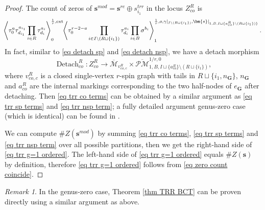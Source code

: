\documentclass[11pt]{amsart}
\theoremstyle{definition}
\theoremstyle{remark}
\newtheorem{rmk}[dummy]{Remark}
\newcommand{\oPMb}{{\overline{\mathcal{PM}}}}
\newcommand{\<}{\left<}
\renewcommand{\>}{\right>}
\numberwithin{equation}{section}
\def\Mbar{{\overline{\mathcal M}}}
\begin{document}
\begin{proof}
         The count of zeros of $\bm{s}^{mod}=\bm{s}^{re}\oplus s^{trr}_{i_1}$ in the locus $Z_{co}^{R}$ %
is 
             \begin{equation}\label{eq trr co terms}
                \hspace{-0.1cm}\left\langle \tau_0^{a}\tau_{d_{i_1}}^{a_{i_1}}\prod_{i \in R}\tau_{d_i}^{a_i}\right\rangle^{\frac{1}{r},\text{ext}}_0
                \hspace{-0.1cm}\left\langle \tau_0^{r-2-a}\prod_{i\in I\setminus(R \sqcup\{i_1\})}\tau^{a_i}_{d_i}\prod_{i\in B}\sigma^{b_i}\right\rangle^{\frac{1}{r},o,\gamma\vert_{I\setminus(R \sqcup\{i_1\})},\bm{s}\vert_{1,B,I\sqcup\{a_{co}^R\}\setminus(R \sqcup\{i_1\})\}}}_1.
            \end{equation}
         In %
fact, similar to \eqref{eq detach sp} and \eqref{eq detach nsp}, we have a detach morphism
        \begin{equation}\label{eq detach co}
         \operatorname{Detach}_{co}^{R}\colon Z^{R}_{co} \to \Mbar_{v_{co,c}^R}\times \oPMb^{1/r,0}_{1,B,I\sqcup \{a_{co}^R\}\setminus (R\sqcup \{i_1\})},
         \end{equation}
         where $v_{co,c}^R$ is a closed single-vertex $r$-spin graph with tails in $R\sqcup \{i_1, n_{\bm{G}}\}$, $n_{\bm{G}}$ and $a_{co}^R$ are the internal markings corresponding to the two half-nodes of $e_{\bm{G}}$ after detaching. Then \eqref{eq trr co terms} can be obtained by a similar argument as \eqref{eq trr sp terms} and \eqref{eq trr nsp term}; a fully detailed argument genus-zero case (which is identical) can be found in \cite[Proof of Lemma 4.14]{BCT2}.

         We can compute $\#Z(\bm{s}^{mod})$ by summing \eqref{eq trr co terms}, \eqref{eq trr sp terms} and \eqref{eq trr nsp term} over all possible partitions, then we get the right-hand side of \eqref{eq trr g=1 ordered}. The left-hand side of \eqref{eq trr g=1 ordered} equals $\#Z(\bm{s})$ by definition, therefore \eqref{eq trr g=1 ordered} follows from \eqref{eq zero count coincide}.

\end{proof}

\begin{rmk}
    In the genus-zero case, Theorem \ref{thm TRR BCT} can be proven directly using a similar argument as above.
\end{rmk}
\end{document}
